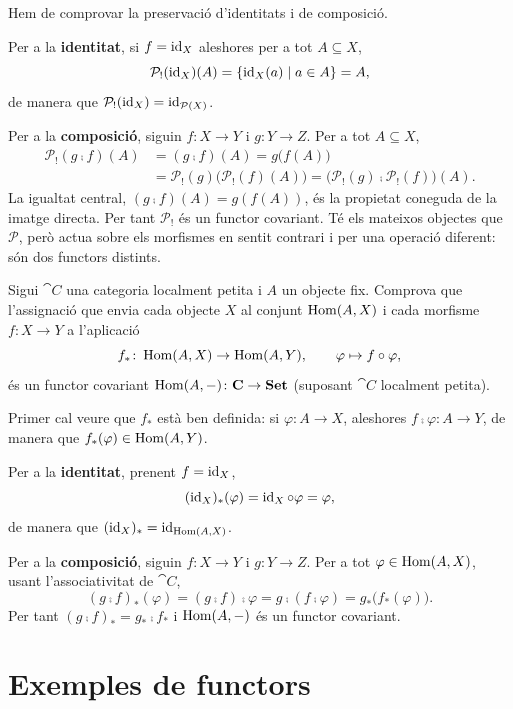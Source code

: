\begin{solucio}
Hem de comprovar la preservació d'identitats i de composició.

Per a la \textbf{identitat}, si $f=\operatorname{id}_X$ aleshores per a tot $A\subseteq X$,
\[
\mathcal P_!(\operatorname{id}_X)(A)=\{\operatorname{id}_X(a)\mid a\in A\}=A,
\]
de manera que $\mathcal P_!(\operatorname{id}_X)=\operatorname{id}_{\mathcal P(X)}$.

Per a la \textbf{composició}, siguin $f\colon X\to Y$ i $g\colon Y\to Z$. Per a tot $A\subseteq X$,
\[
\begin{aligned}
\mathcal P_!(g\comp f)(A)&=(g\comp f)(A)=g\big(f(A)\big)\\
&=\mathcal P_!(g)\big(\mathcal P_!(f)(A)\big)=\big(\mathcal P_!(g)\comp\mathcal P_!(f)\big)(A).
\end{aligned}
\]
La igualtat central, $(g\comp f)(A)=g(f(A))$, és la propietat coneguda de la imatge directa. Per tant $\mathcal P_!$ és un functor covariant. Té els mateixos objectes que $\mathcal P$, però actua sobre els morfismes en sentit contrari i per una operació diferent: són dos functors distints.
\end{solucio}

\begin{exercici}\label{pr-hom-cov}
Sigui $\cat{C}$ una categoria localment petita i $A$ un objecte fix. Comprova que l'assignació que envia cada objecte $X$ al conjunt $\operatorname{Hom}(A,X)$ i cada morfisme $f\colon X\to Y$ a l'aplicació
\[
f_*\colon\operatorname{Hom}(A,X)\to\operatorname{Hom}(A,Y),
\qquad
\varphi\mapsto f\circ\varphi,
\]
és un functor covariant $\operatorname{Hom}(A,-)\colon\mathbf{C}\to\mathbf{Set}$ (suposant $\cat{C}$ localment petita).
\end{exercici}

\begin{solucio}
Primer cal veure que $f_*$ està ben definida: si $\varphi\colon A\to X$, aleshores $f\comp\varphi\colon A\to Y$, de manera que $f_*(\varphi)\in\operatorname{Hom}(A,Y)$.

Per a la \textbf{identitat}, prenent $f=\operatorname{id}_X$,
\[
(\operatorname{id}_X)_*(\varphi)=\operatorname{id}_X\circ\varphi=\varphi,
\]
de manera que $(\operatorname{id}_X)_*=\operatorname{id}_{\operatorname{Hom}(A,X)}$.

Per a la \textbf{composició}, siguin $f\colon X\to Y$ i $g\colon Y\to Z$. Per a tot $\varphi\in\operatorname{Hom}(A,X)$, usant l'associativitat de $\cat{C}$,
\[
(g\comp f)_*(\varphi)=(g\comp f)\comp\varphi=g\comp(f\comp\varphi)=g_*\big(f_*(\varphi)\big).
\]
Per tant $(g\comp f)_*=g_*\comp f_*$ i $\operatorname{Hom}(A,-)$ és un functor covariant.
\end{solucio}

\section{Exemples de functors}

